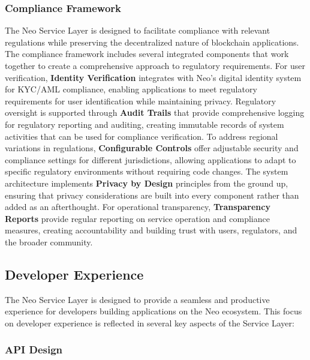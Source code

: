 \documentclass[12pt,a4paper]{article}
\begin{document}
\subsubsection{Compliance Framework}
\label{subsubsec:compliance-framework}

The Neo Service Layer is designed to facilitate compliance with relevant regulations while preserving the decentralized nature of blockchain applications. The compliance framework includes several integrated components that work together to create a comprehensive approach to regulatory requirements. For user verification, \textbf{Identity Verification} integrates with Neo's digital identity system for KYC/AML compliance, enabling applications to meet regulatory requirements for user identification while maintaining privacy. Regulatory oversight is supported through \textbf{Audit Trails} that provide comprehensive logging for regulatory reporting and auditing, creating immutable records of system activities that can be used for compliance verification. To address regional variations in regulations, \textbf{Configurable Controls} offer adjustable security and compliance settings for different jurisdictions, allowing applications to adapt to specific regulatory environments without requiring code changes. The system architecture implements \textbf{Privacy by Design} principles from the ground up, ensuring that privacy considerations are built into every component rather than added as an afterthought. For operational transparency, \textbf{Transparency Reports} provide regular reporting on service operation and compliance measures, creating accountability and building trust with users, regulators, and the broader community.

\subsection{Developer Experience}
\label{subsec:nsl-developer}

The Neo Service Layer is designed to provide a seamless and productive experience for developers building applications on the Neo ecosystem. This focus on developer experience is reflected in several key aspects of the Service Layer:

\subsubsection{API Design}
\label{subsubsec:api-design}
\end{document}
